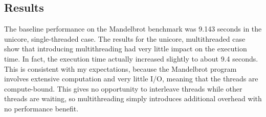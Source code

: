 \documentclass[bsc,frontabs,singlespacing,parskip,deptreport]{infthesis}
\begin{document}
\subsection{Results} \label{mb-benchmark-results}
The baseline performance on the Mandelbrot benchmark was 9.143 seconds in the unicore, single-threaded case. The results for the unicore, multithreaded case show that introducing multithreading had very little impact on the execution time. In fact, the execution time actually increased slightly to about 9.4 seconds. This is consistent with my expectations, because the Mandelbrot program involves extensive computation and very little I/O, meaning that the threads are compute-bound. This gives no opportunity to interleave threads while other threads are waiting, so multithreading simply introduces additional overhead with no performance benefit. 
\end{document}
